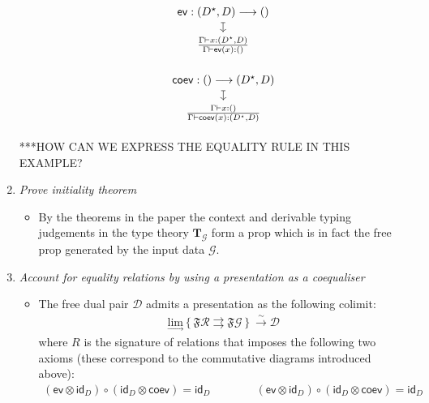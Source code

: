 \documentclass[pra,floatfix,
amsmath,superscriptaddress, 12pt]{article}
\theoremstyle{definition}
\newcommand{\fF}{\mathfrak{F}}
\newcommand{\cG}{\mathcal{G}}
\newcommand{\cR}{\mathcal{R}}
\newcommand{\cD}{\mathcal{D}}
\begin{document}
\begin{enumerate}
\begin{itemize}
			\begin{minipage}{0.42\textwidth}
				\begin{displaymath}
					\begin{tikzcd}[ampersand replacement=\&, row sep=small]
						\mathsf{ev}:(D^{\star},D)\longrightarrow ()
						\arrow[d, mapsto]
							\\
						\frac{\Gamma \vdash x:(D^{\star},D)}{\Gamma \vdash \mathsf{ev}(x):()}
					\end{tikzcd}
				\end{displaymath}
			\end{minipage}
			\begin{minipage}{0.42\textwidth}
				\begin{displaymath}
					\begin{tikzcd}[ampersand replacement=\&, row sep=small]
						\mathsf{coev}:()\longrightarrow (D^{\star},D) 
						\arrow[d, mapsto]
							\\
						\frac{\Gamma \vdash x:()}{\Gamma \vdash \mathsf{coev}(x):(D^{\star},D)}
					\end{tikzcd}
				\end{displaymath}
			\end{minipage}
		\end{itemize}	
		***HOW CAN WE EXPRESS THE EQUALITY RULE IN THIS EXAMPLE?
	\item \textit{Prove initiality theorem}
\begin{itemize}
	\item By the theorems in the paper the context and derivable typing judgements in the type theory $\mathbf{T}_\cG$ form a prop which is in fact the free prop generated by the input data $\cG$.
	\end{itemize}	

	\item \textit{Account for equality relations by using a presentation as a coequaliser}
	\begin{itemize}
		\item The free dual pair $\cD$ admits a presentation as the following colimit:
		\begin{align*}
			\underset{\longrightarrow}{\textrm{lim}}
			\left\{
				\fF \cR\rightrightarrows \fF \cG
			\right\}
			\overset{\sim}{\longrightarrow}
			\cD
		\end{align*}
		where $R$ is the signature of relations that imposes the following two axioms (these correspond to the commutative diagrams introduced above):
		\begin{align*}	      
	     (\mathsf{ev}\otimes\mathsf{id}_{D})\circ (\mathsf{id}_{D} \otimes \mathsf{coev})=\mathsf{id}_{D} \qquad\qquad(\mathsf{ev} \otimes \mathsf{id}_{D}) \circ (\mathsf{id}_{D} \otimes \mathsf{coev})=\mathsf{id}_{D}
\end{align*}


\end{itemize}
\end{enumerate}
\end{document}
